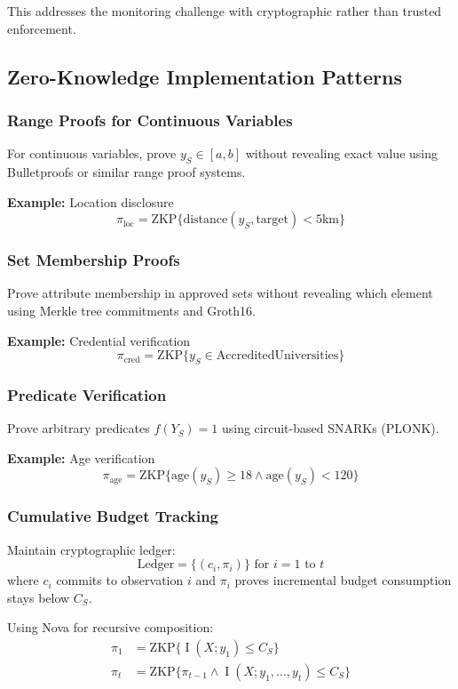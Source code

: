 \documentclass[11pt,a4paper]{article}
\theoremstyle{definition}
\DeclareMathOperator{\I}{I}
\begin{document}
This addresses the monitoring challenge with cryptographic rather than trusted enforcement.

\subsection{Zero-Knowledge Implementation Patterns}

\subsubsection{Range Proofs for Continuous Variables}

For continuous variables, prove $y_S \in [a,b]$ without revealing exact value using Bulletproofs or similar range proof systems.

\textbf{Example:} Location disclosure
\[
\pi_{\text{loc}} = \text{ZKP}\{\text{distance}(y_S, \text{target}) < 5\text{km}\}
\]

\subsubsection{Set Membership Proofs}

Prove attribute membership in approved sets without revealing which element using Merkle tree commitments and Groth16.

\textbf{Example:} Credential verification
\[
\pi_{\text{cred}} = \text{ZKP}\{y_S \in \text{AccreditedUniversities}\}
\]

\subsubsection{Predicate Verification}

Prove arbitrary predicates $f(Y_S) = 1$ using circuit-based SNARKs (PLONK).

\textbf{Example:} Age verification
\[
\pi_{\text{age}} = \text{ZKP}\{\text{age}(y_S) \geq 18 \land \text{age}(y_S) < 120\}
\]

\subsubsection{Cumulative Budget Tracking}

Maintain cryptographic ledger:
\[
\text{Ledger} = \{(c_i, \pi_i)\} \text{ for } i = 1 \text{ to } t
\]
where $c_i$ commits to observation $i$ and $\pi_i$ proves incremental budget consumption stays below $C_S$.

Using Nova for recursive composition:
\begin{align}
\pi_1 &= \text{ZKP}\{\I(X; y_1) \leq C_S\} \\
\pi_t &= \text{ZKP}\{\pi_{t-1} \land \I(X; y_1, \ldots, y_t) \leq C_S\}
\end{align}
\end{document}
